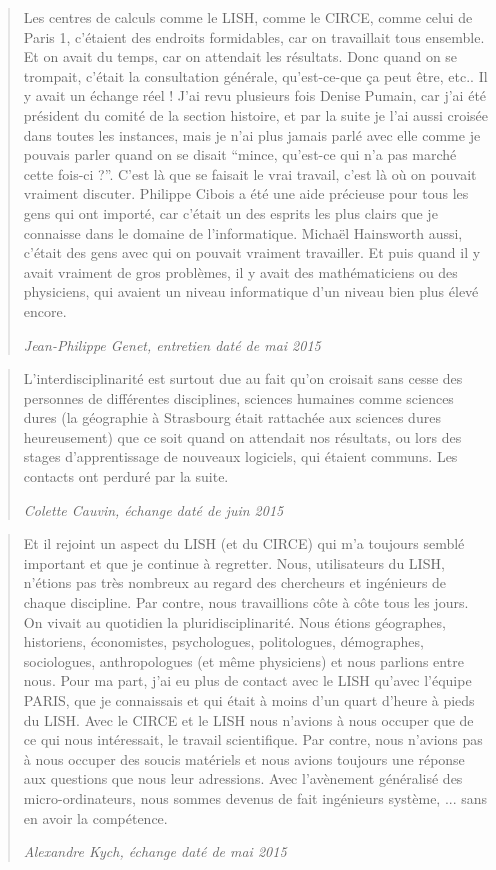 \blockquote[\textit{Jean-Philippe Genet, entretien daté de mai 2015}]{Les centres de calculs comme le LISH, comme le CIRCE, comme celui de Paris 1, c'étaient des endroits formidables, car on travaillait tous ensemble. Et on avait du temps, car on attendait les résultats. Donc quand on se trompait, c'était la consultation générale, qu'est-ce-que ça peut être, etc..  Il y avait un échange réel ! J'ai revu plusieurs fois Denise Pumain, car j'ai été président du comité de la section histoire, et par la suite je l'ai aussi croisée dans toutes les instances, mais je n'ai plus jamais parlé avec elle comme je pouvais parler quand on se disait \enquote{mince, qu'est-ce qui n'a pas marché cette fois-ci ?}. C'est là que se faisait le vrai travail, c'est là où on pouvait vraiment discuter. Philippe Cibois a été une aide précieuse pour tous les gens qui ont importé, car c'était un des esprits les plus clairs que je connaisse dans le domaine de l'informatique. Michaël Hainsworth aussi, c'était des gens avec qui on pouvait vraiment travailler. Et puis quand il y avait vraiment de gros problèmes, il y avait des mathématiciens ou des physiciens, qui avaient un niveau informatique d'un niveau bien plus élevé encore.}

\blockquote[\textit{Colette Cauvin, échange daté de juin 2015}]{L’interdisciplinarité est surtout due au fait qu’on croisait sans cesse des personnes de différentes disciplines, sciences humaines comme sciences dures (la géographie à Strasbourg était rattachée aux sciences dures heureusement) que ce soit quand on attendait nos résultats, ou lors des stages d’apprentissage de nouveaux logiciels, qui étaient communs. Les contacts ont perduré par la suite.}

\blockquote[\textit{Alexandre Kych, échange daté de mai 2015}]{Et il rejoint un aspect du LISH (et du CIRCE) qui m'a toujours semblé important et que je continue à regretter. Nous, utilisateurs du LISH, n'étions pas très nombreux au regard des chercheurs et ingénieurs de chaque discipline. Par contre, nous travaillions côte à côte tous les jours. On vivait au quotidien la pluridisciplinarité. Nous étions géographes, historiens, économistes, psychologues, politologues, démographes, sociologues, anthropologues (et même physiciens) et nous parlions entre nous. Pour ma part, j'ai eu plus de contact avec le LISH qu'avec l'équipe PARIS, que je connaissais et qui était à moins d'un quart d'heure à pieds du LISH. Avec le CIRCE et le LISH nous n'avions à nous occuper que de ce qui nous intéressait, le travail scientifique. Par contre, nous n'avions pas à nous occuper des soucis matériels et nous avions toujours une réponse aux questions que nous leur adressions. Avec l'avènement généralisé des micro-ordinateurs, nous sommes devenus de fait ingénieurs système, ... sans en avoir la compétence.}


